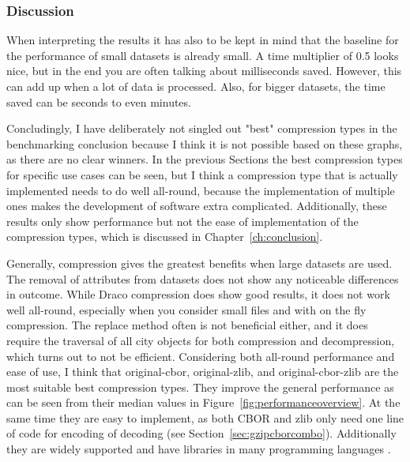 \subsubsection{Discussion}

When interpreting the results it has also to be kept in mind that the baseline for the performance of small datasets is already small.
A time multiplier of 0.5 looks nice, but in the end you are often talking about milliseconds saved.
However, this can add up when a lot of data is processed.
Also, for bigger datasets, the time saved can be seconds to even minutes.

Concludingly, I have deliberately not singled out "best" compression types in the benchmarking conclusion because I think it is not possible based on these graphs, as there are no clear winners.
In the previous Sections the best compression types for specific use cases can be seen, but I think a compression type that is actually implemented needs to do well all-round, because the implementation of multiple ones makes the development of software extra complicated.
Additionally, these results only show performance but not the ease of implementation of the compression types, which is discussed in Chapter~\ref{ch:conclusion}.

Generally, compression gives the greatest benefits when large datasets are used.
The removal of attributes from datasets does not show any noticeable differences in outcome.
While Draco compression does show good results, it does not work well all-round, especially when you consider small files and with on the fly compression.
The replace method often is not beneficial either, and it does require the traversal of all city objects for both compression and decompression, which turns out to not be efficient.
Considering both all-round performance and ease of use, I think that original-cbor, original-zlib, and original-cbor-zlib are the most suitable best compression types.
They improve the general performance as can be seen from their median values in Figure~\ref{fig:performanceoverview}.
At the same time they are easy to implement, as both CBOR and zlib only need one line of code for encoding of decoding (see Section~\ref{sec:gzipcborcombo}).
Additionally they are widely supported and have libraries in many programming languages \citep{CBOR2020, zlib2020}.

